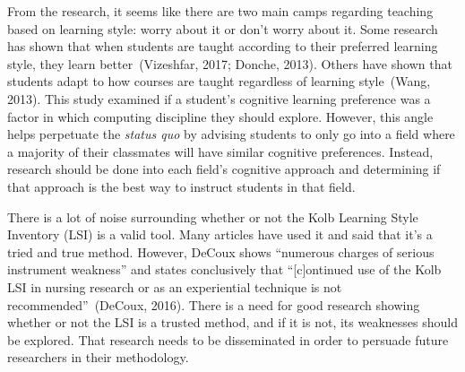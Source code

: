 From the research, it seems like there are two main camps regarding teaching based on learning style: worry about it or don't worry about it. Some research has shown that when students are taught according to their preferred learning style, they learn better~(Vizeshfar, 2017; Donche, 2013). Others have shown that students adapt to how courses are taught regardless of learning style~(Wang, 2013). This study examined if a student's cognitive learning preference was a factor in which computing discipline they should explore. However, this angle helps perpetuate the \textit{status quo} by advising students to only go into a field where a majority of their classmates will have similar cognitive preferences. Instead, research should be done into each field's cognitive approach and determining if that approach is the best way to instruct students in that field.

There is a lot of noise surrounding whether or not the Kolb Learning Style Inventory (LSI) is a valid tool. Many articles have used it and said that it's a tried and true method. However, DeCoux shows ``numerous charges of serious instrument weakness'' and states conclusively that ``[c]ontinued use of the Kolb LSI in nursing research or as an experiential technique is not recommended''~(DeCoux, 2016). There is a need for good research showing whether or not the LSI is a trusted method, and if it is not, its weaknesses should be explored. That research needs to be disseminated in order to persuade future researchers in their methodology.

